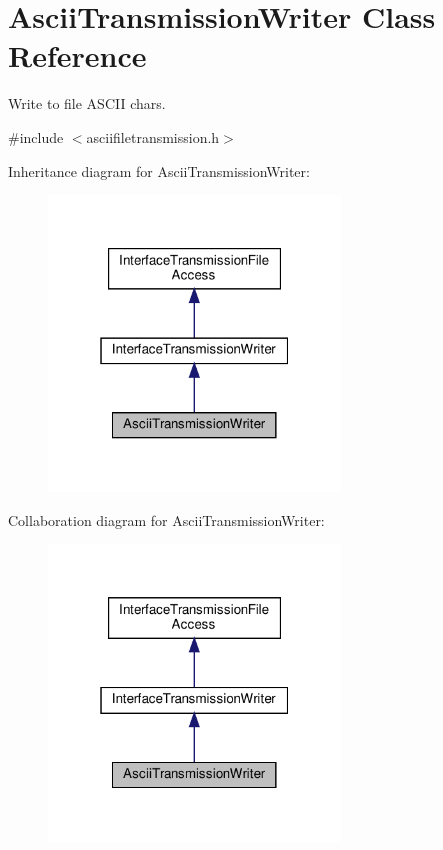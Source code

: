 \hypertarget{classAsciiTransmissionWriter}{}\section{Ascii\+Transmission\+Writer Class Reference}
\label{classAsciiTransmissionWriter}


Write to file A\+S\+C\+II chars.  




{\ttfamily \#include $<$asciifiletransmission.\+h$>$}



Inheritance diagram for Ascii\+Transmission\+Writer\+:\nopagebreak
\begin{figure}[H]
\begin{center}
\leavevmode
\includegraphics[width=220pt]{d1/ded/classAsciiTransmissionWriter__inherit__graph}
\end{center}
\end{figure}


Collaboration diagram for Ascii\+Transmission\+Writer\+:\nopagebreak
\begin{figure}[H]
\begin{center}
\leavevmode
\includegraphics[width=220pt]{df/d49/classAsciiTransmissionWriter__coll__graph}
\end{center}
\end{figure}
